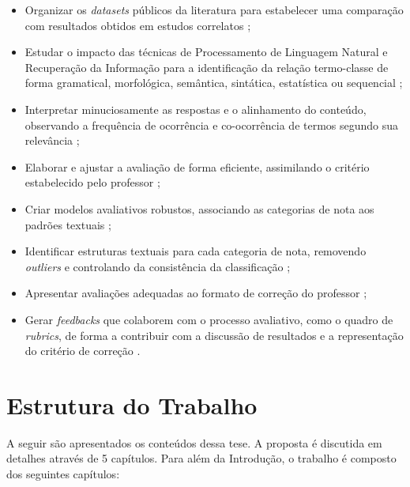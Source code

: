 \begin{itemize}
\item Organizar os \textit{datasets} públicos da literatura para estabelecer uma comparação com resultados obtidos em estudos correlatos \cite{burrows2015};
\item Estudar o impacto das técnicas de Processamento de Linguagem Natural e Recuperação da Informação para a identificação da relação termo-classe de forma gramatical, morfológica, semântica, sintática, estatística ou sequencial \cite{galhardi2018a, kumar2019, sahu2020};
\item Interpretar minuciosamente as respostas e o alinhamento do conteúdo, observando a frequência de ocorrência e co-ocorrência de termos segundo sua relevância \cite{jordan2012, saha2018, ding2020};
\item Elaborar e ajustar a avaliação de forma eficiente, assimilando o critério estabelecido pelo professor \cite{zesch2015, condor2020, lui2022};
\item Criar modelos avaliativos robustos, associando as categorias de nota aos padrões textuais \cite{butcher2010, heilman2015, burrows2015};
\item Identificar estruturas textuais para cada categoria de nota, removendo \textit{outliers} e controlando da consistência da classificação \cite{ding2020, filighera2020};
\item Apresentar avaliações adequadas ao formato de correção do professor \cite{higgins2014, funayama2020, pado2021};
\item Gerar \textit{feedbacks} que colaborem com o processo avaliativo, como o quadro de \textit{rubrics}, de forma a contribuir com a discussão de resultados e a representação do critério de correção \cite{mizumoto2019, suzen2020, bernius2022}.
\end{itemize}


\section{Estrutura do Trabalho}

A seguir são apresentados os conteúdos dessa tese. A proposta é discutida em detalhes através de 5 capítulos. Para além da Introdução, o trabalho é composto dos seguintes capítulos:

